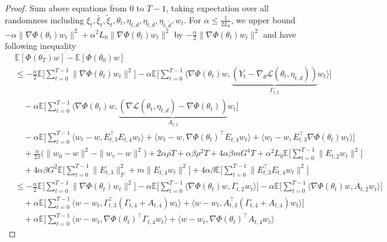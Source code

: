 \documentclass[twoside]{article} %
\theoremstyle{plain}
\theoremstyle{definition}
\theoremstyle{remark}
\newcommand{\fL}{\mathcal{L}}
\begin{document}
\begin{proof}
Sum above equations from $0$ to $T-1$, taking expectation over all randomness including $\xi_t, \bar{\xi}_t, \tilde{\xi}_t,\theta_t,\eta_{t,d},\eta_{t,\bar{d}},\eta_{t,\tilde{d}}, w_t$. For ${\alpha\leq \frac{1}{2L_0}}$, we upper bound $-\alpha \|\nabla\Phi(\theta_t)w_t\|^2+\alpha^2 L_0\|\nabla\Phi(\theta_t)w_t\|^2$ by $-\frac{\alpha}{2}\|\nabla \Phi(\theta_t)w_t\|^2$ and have following inequality
\begin{align}
    &\mathbb{E}[\Phi(\theta_{T}){w}] - \mathbb{E}[\Phi({\theta}_0){w}] \nonumber\\
    &\leq -\frac{\alpha}{2} \mathbb{E}\big[\sum_{t=0}^{T-1}\|\nabla \Phi({\theta}_t){w}_t \|^2\big] -\alpha {\mathbb{E}\big[ \sum_{t=0}^{T-1}\langle \nabla \Phi({\theta}_t){w},\underbrace{(Y_{t}-\nabla_{\theta}\fL(\theta_t, \eta_{t,d}))}_{\Gamma_{t,2}}{w_t}\rangle \big]}\nonumber\\
    &\quad -\alpha {\mathbb{E}\big[\sum_{t=0}^{T-1}\langle \nabla \Phi(\theta_t)w, \underbrace{(\nabla \fL(\theta_t,\eta_{t,d}) - \nabla \Phi(\theta_t))}_{A_{t,2}} w_t \big]} \nonumber\\
    &\quad -\alpha { \mathbb{E}\big[\sum_{t=0}^{T-1} \langle w_t - w, E_{t,3}^{\top} E_{t,4}w_t \rangle+\langle w_t -w, \nabla \Phi(\theta_t)^{\top}E_{t,4}w_t\rangle+\langle w_t -w, E_{t,3}^{\top}\nabla \Phi(\theta_t)w_t \rangle \big]} \nonumber\\
    &\quad +\frac{\alpha}{2\beta}\big(\|w_{0}-w \|^2-\|w_{\tau}-w\|^2\big)+ 2\alpha \rho T + \alpha\beta\rho^2T + 4\alpha\beta m G^4 T+\alpha^2 L_0 \mathbb{E}\big[ \sum_{t=0}^{T-1} \|E_{t,2}w_t\|^2\big] \nonumber\\
    &\quad +4\alpha\beta G^2 \mathbb{E}\big [\sum_{t=0}^{T-1} \|E_{t,3} \|_F^2+m\|{E}_{t,4}w_t\|^2 \big] + 4\alpha\beta \mathbb{E}\big[\sum_{t=0}^{T-1} \|E_{t,3}^{\top}E_{t,4}w_t\|^2 \big] \nonumber\\
    &\leq -\frac{\alpha}{2} \mathbb{E}\big[\sum_{t=0}^{T-1}\|\nabla \Phi({\theta}_t){w}_t \|^2\big] -\alpha {\mathbb{E}\big[ \sum_{t=0}^{T-1}\langle \nabla \Phi({\theta}_t){w},\Gamma_{t,2}{w_t}\rangle \big]}-\alpha {\mathbb{E}\big[\sum_{t=0}^{T-1}\langle \nabla \Phi(\theta_t)w, A_{t,2} w_t \rangle\big]} \nonumber\\
    &\quad +\alpha {\mathbb{E}\big[\sum_{t=0}^{T-1} \langle w-w_t, \Gamma_{t,3}^{\top} (\Gamma_{t,4}+A_{t,4})w_t \rangle +\langle w-w_t, A_{t,3}^{\top} (\Gamma_{t,4}+ A_{t,4})w_t \rangle \big]} \nonumber\\
    &\quad +\alpha{\mathbb{E}\big[\sum_{t=0}^{T-1}\langle w -w_t, \nabla \Phi(\theta_t)^{\top}\Gamma_{t,4}w_t\rangle + \langle w -w_t, \nabla \Phi(\theta_t)^{\top}A_{t,4}w_t\rangle
}
\end{align}
\end{proof}
\end{document}
